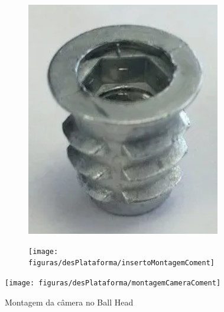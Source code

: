 \begin{figure}[!htb]
	\centering
	\caption{Fixação no tripé: (a) Inserto e (b) Montagem}
	\captionsetup[subfigure]{justification=centering}
	\begin{subfigure}[b]{0.24\textwidth}
		\centering
		\includegraphics[width=\textwidth]{figuras/desPlataforma/insertoMadeira}
		\caption{}
		\label{fig:insertoMadeira}
	\end{subfigure}
	\hfill
	\begin{subfigure}[b]{0.74\textwidth}
		\centering
		\texttt{[image: figuras/desPlataforma/insertoMontagemComent]}
		\caption{}
		\label{fig:insertoMontagem}
	\end{subfigure}
	
\end{figure}

\begin{figure}[!htb]
	\centering
	\caption{Montagem da câmera no Ball Head}
	\texttt{[image: figuras/desPlataforma/montagemCameraComent]}
	\label{fig:renderMontagemCamera}
\end{figure}

